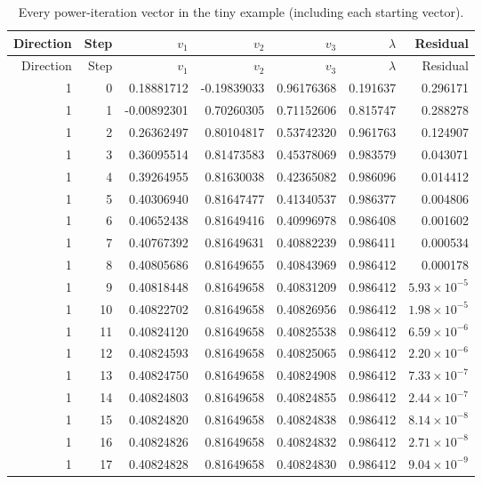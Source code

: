 {\footnotesize\renewcommand{\arraystretch}{1}
\begin{longtable}{rrrrrrr}
\caption{Every power-iteration vector in the tiny example (including each starting vector).}\\
\toprule
Direction & Step & $v_1$ & $v_2$ & $v_3$ & $\lambda$ & Residual \\ \midrule\endfirsthead
\toprule
Direction & Step & $v_1$ & $v_2$ & $v_3$ & $\lambda$ & Residual \\ \midrule\endhead
1 & 0 & 0.18881712 & -0.19839033 & 0.96176368 & 0.191637 & 0.296171 \\
1 & 1 & -0.00892301 & 0.70260305 & 0.71152606 & 0.815747 & 0.288278 \\
1 & 2 & 0.26362497 & 0.80104817 & 0.53742320 & 0.961763 & 0.124907 \\
1 & 3 & 0.36095514 & 0.81473583 & 0.45378069 & 0.983579 & 0.043071 \\
1 & 4 & 0.39264955 & 0.81630038 & 0.42365082 & 0.986096 & 0.014412 \\
1 & 5 & 0.40306940 & 0.81647477 & 0.41340537 & 0.986377 & 0.004806 \\
1 & 6 & 0.40652438 & 0.81649416 & 0.40996978 & 0.986408 & 0.001602 \\
1 & 7 & 0.40767392 & 0.81649631 & 0.40882239 & 0.986411 & 0.000534 \\
1 & 8 & 0.40805686 & 0.81649655 & 0.40843969 & 0.986412 & 0.000178 \\
1 & 9 & 0.40818448 & 0.81649658 & 0.40831209 & 0.986412 & $5.93\times10^{-5}$ \\
1 & 10 & 0.40822702 & 0.81649658 & 0.40826956 & 0.986412 & $1.98\times10^{-5}$ \\
1 & 11 & 0.40824120 & 0.81649658 & 0.40825538 & 0.986412 & $6.59\times10^{-6}$ \\
1 & 12 & 0.40824593 & 0.81649658 & 0.40825065 & 0.986412 & $2.20\times10^{-6}$ \\
1 & 13 & 0.40824750 & 0.81649658 & 0.40824908 & 0.986412 & $7.33\times10^{-7}$ \\
1 & 14 & 0.40824803 & 0.81649658 & 0.40824855 & 0.986412 & $2.44\times10^{-7}$ \\
1 & 15 & 0.40824820 & 0.81649658 & 0.40824838 & 0.986412 & $8.14\times10^{-8}$ \\
1 & 16 & 0.40824826 & 0.81649658 & 0.40824832 & 0.986412 & $2.71\times10^{-8}$ \\
1 & 17 & 0.40824828 & 0.81649658 & 0.40824830 & 0.986412 & $9.04\times10^{-9}$ \\

\end{longtable}}
